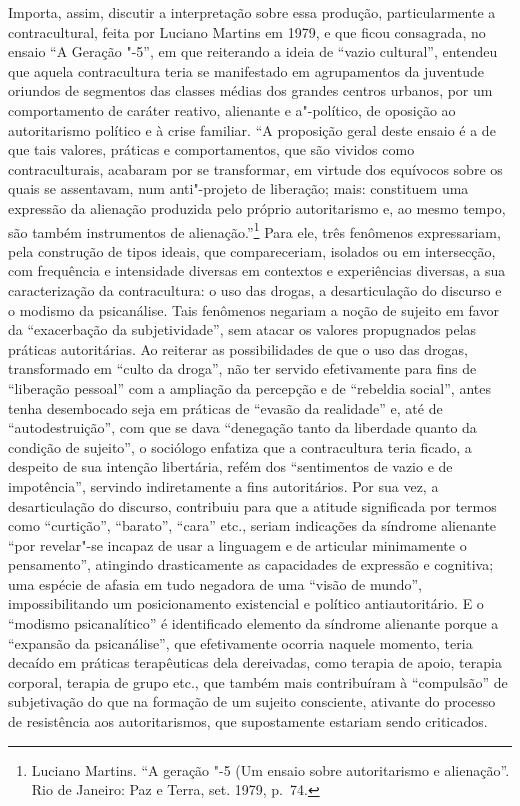 Importa, assim, discutir a interpretação sobre essa produção,
particularmente a contracultural, feita por Luciano Martins em 1979, e
que ficou consagrada, no ensaio ``A Geração "-5'', em que reiterando a
ideia de ``vazio cultural'', entendeu que aquela contracultura teria se
manifestado em agrupamentos da juventude oriundos de segmentos das
classes médias dos grandes centros urbanos, por um comportamento de
caráter reativo, alienante e a"-político, de oposição ao autoritarismo
político e à crise familiar. ``A proposição geral deste ensaio é a de que
tais valores, práticas e comportamentos, que são vividos como
contraculturais, acabaram por se transformar, em virtude dos equívocos
sobre os quais se assentavam, num anti"-projeto de liberação; mais:
constituem uma expressão da alienação produzida pelo próprio
autoritarismo e, ao mesmo tempo, são também instrumentos de
alienação.''\footnote{Luciano Martins. ``A geração "-5 (Um ensaio
  sobre autoritarismo e alienação''. {}
  Rio de Janeiro: Paz e Terra, set. 1979, p.~74.} Para ele, três fenômenos
expressariam, pela construção de tipos ideais, que compareceriam,
isolados ou em intersecção, com frequência e intensidade diversas em
contextos e experiências diversas, a sua caracterização da
contracultura: o uso das drogas, a desarticulação do discurso e o
modismo da psicanálise. Tais fenômenos
negariam a noção de sujeito em favor da ``exacerbação da
subjetividade'', sem atacar os valores propugnados pelas práticas
autoritárias. Ao reiterar as possibilidades de que o uso das drogas,
transformado em ``culto da droga'', não ter servido efetivamente para
fins de ``liberação pessoal'' com a ampliação da percepção e de
``rebeldia social'', antes tenha desembocado seja em práticas de
``evasão da realidade'' e, até de ``autodestruição'', com que se dava
``denegação tanto da liberdade quanto da condição de sujeito'', o
sociólogo enfatiza que a contracultura teria ficado, a despeito de sua
intenção libertária, refém dos ``sentimentos de vazio e de impotência'',
servindo indiretamente a fins autoritários. Por sua vez, a
desarticulação do discurso, contribuiu para que a atitude significada
por termos como ``curtição'', ``barato'', ``cara'' etc., seriam
indicações da síndrome alienante ``por revelar"-se incapaz de usar a
linguagem e de articular minimamente o pensamento'', atingindo
drasticamente as capacidades de expressão e cognitiva; uma espécie de
afasia em tudo negadora de uma ``visão de mundo'', impossibilitando um
posicionamento existencial e político antiautoritário. E o ``modismo
psicanalítico'' é identificado elemento da síndrome alienante porque a
``expansão da psicanálise'', que efetivamente ocorria naquele momento,
teria decaído em práticas terapêuticas dela dereivadas, como terapia de
apoio, terapia corporal, terapia de grupo etc., que também mais
contribuíram à ``compulsão'' de subjetivação do que na formação de um
sujeito consciente, ativante do processo de resistência aos
autoritarismos, que supostamente estariam sendo criticados.

